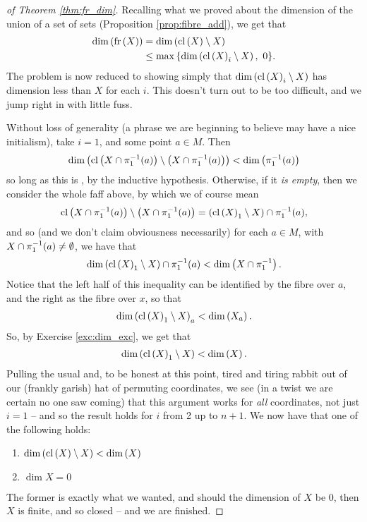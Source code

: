 \begin{proof}[of Theorem \ref{thm:fr_dim}]
    Recalling what we proved about the dimension of the union of a set of sets (Proposition \ref{prop:fibre_add}), we get that
      \begin{align*}
        \operatorname{dim}\left(\operatorname{fr}\left(X\right)\right) &= \operatorname{dim}\left(\operatorname{cl}\left(X\right) \setminus X\right)\\
                     &\leq \max{ \left\{ \operatorname{dim}\left(\operatorname{cl}\left(X\right)_i \setminus X\right), \ 0 \right\} }.
      \end{align*}
      The problem is now reduced to showing simply that $\operatorname{dim}\left(\operatorname{cl}\left(X\right)_i \setminus X\right)$ has dimension less than $X$ for each $i$. This doesn't turn out to be too difficult, and we jump right in with little fuss.

      Without loss of generality (a phrase we are beginning to believe may have a nice initialism), take $i = 1$, and some point $a \in M$. Then
        \begin{align*}
          \operatorname{dim}\left( \operatorname{cl}\left(X \cap \pi_1^{-1}(a)\right) \setminus \left( X \cap \pi_1^{-1}(a) \right) \right) < \operatorname{dim}\left(\pi_1^{-1}(a)\right)
        \end{align*}
      so long as this is \inhb, by the inductive hypothesis. Otherwise, if it \emph{is empty}, then we consider the whole faff above, by which we of course mean
        \begin{align*}
          \operatorname{cl}\left(X \cap \pi_1^{-1}(a)\right) \setminus \left( X \cap \pi_1^{-1}(a) \right) = \left( \operatorname{cl}\left(X\right)_1 \setminus X \right) \cap \pi_1^{-1}(a),
        \end{align*}
      and so (and we don't claim obviousness necessarily) for each $a \in M$, with $X \cap \pi_1^{-1}(a) \neq \emptyset$, we have that
        \begin{align*}
          \operatorname{dim}\left(\operatorname{cl}\left(X\right)_1 \setminus X\right) \cap \pi_1^{-1}(a) < \operatorname{dim}\left(X \cap \pi_1^{-1}\right).
        \end{align*}
      Notice that the left half of this inequality can be identified by the fibre over $a$, and the right as the fibre over $x$, so that
        \begin{align*}
          \operatorname{dim}\left(\operatorname{cl}\left(X\right)_1 \setminus X\right)_a < \operatorname{dim}\left(X_a\right).
        \end{align*}
      So, by Exercise \ref{exc:dim_exc}, we get that
        \begin{align*}
          \operatorname{dim}\left(\operatorname{cl}\left(X\right)_1 \setminus X\right) < \operatorname{dim}\left(X\right).
        \end{align*}
      Pulling the usual and, to be honest at this point, tired and tiring rabbit out of our (frankly garish) hat of permuting coordinates, we see (in a twist we are certain no one saw coming) that this argument works for \emph{all} coordinates, not just $i = 1$ -- and so the result holds for $i$ from 2 up to $n + 1$. We now have that one of the following holds:
        \begin{enumerate}
         \item $\operatorname{dim}\left(\operatorname{cl}\left(X\right) \setminus X\right) < \operatorname{dim}\left(X\right)$
         \item $\dim{X} = 0$
       \end{enumerate}
      The former is exactly what we wanted, and should the dimension of $X$ be 0, then $X$ is finite, and so closed -- and we are finished.
      \smartqed
\end{proof}

